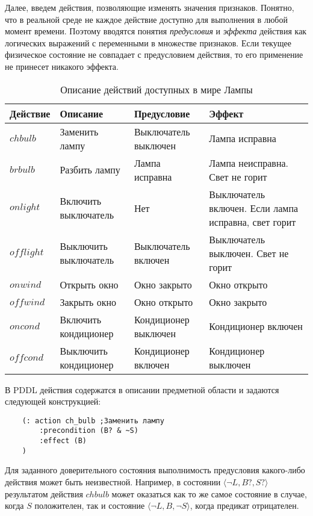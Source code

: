 Далее, введем действия, позволяющие изменять значения признаков.
Понятно, что в реальной среде не каждое действие доступно для выполнения
в любой момент времени. Поэтому вводятся понятия \emph{предусловия} и
\emph{эффекта} действия как логических выражений с переменными в
множестве признаков. Если текущее физическое состояние не совпадает с
предусловием действия, то его применение не принесет никакого эффекта.

\begin{table}[h]
\begin{tabular}{l | l | l | p{5cm} }
\hline
Действие & Описание & Предусловие & Эффект \\
\hline
$chbulb$ & Заменить лампу & Выключатель выключен & Лампа исправна \\
$brbulb$ & Разбить лампу & Лампа исправна & Лампа неисправна. Свет не
горит \\
$onlight$ & Включить выключатель & Нет & Выключатель включен. Если лампа
исправна, свет горит \\
$offlight$ & Выключить выключатель & Выключатель включен & Выключатель
выключен. Свет не горит \\
$onwind$ & Открыть окно & Окно закрыто & Окно открыто \\
$offwind$ & Закрыть окно & Окно открыто & Окно закрыто \\
$oncond$ & Включить кондиционер & Кондиционер выключен & Кондиционер
включен \\
$offcond$ & Выключить кондиционер & Кондиционер включен & Кондиционер
выключен \\
\hline
\end{tabular}
\caption{Описание действий доступных в мире Лампы}
\end{table}

В PDDL действия содержатся в описании предметной области и задаются
следующей конструкцией:

\begin{verbatim}
    (: action ch_bulb ;Заменить лампу
        :precondition (B? & ~S)
        :effect (B)
    )
\end{verbatim}

Для заданного доверительного состояния выполнимость предусловия
какого-либо действия может быть неизвестной. Например, в состоянии
$\langle\neg L, B?, S?\rangle$ результатом действия $chbulb$ может оказаться как то же самое состояние
в случае, когда $S$ положителен, так и состояние
$\langle\neg L, B, \neg S\rangle$, когда предикат отрицателен.

